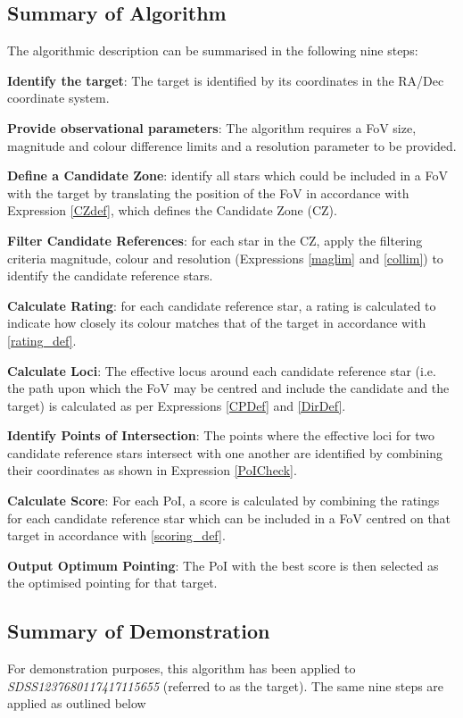 \documentclass{aa}
\begin{document}
\subsection{Summary of Algorithm}
The algorithmic description can be summarised in the following nine steps:

\textbf{Identify the target}: The target is identified by its coordinates in the RA/Dec coordinate system.

\textbf{Provide observational parameters}: The algorithm requires a FoV size, magnitude and colour difference limits and a resolution parameter to be provided.

\textbf{Define a Candidate Zone}: identify all stars which could be included in a FoV with the target by translating the position of the FoV in accordance with Expression \ref{CZdef}, which defines the Candidate Zone (CZ).

\textbf{Filter Candidate References}: for each star in the CZ, apply the filtering criteria magnitude, colour and resolution (Expressions \ref{maglim} and \ref{collim}) to identify the candidate reference stars.

\textbf{Calculate Rating}: for each candidate reference star, a rating is calculated to indicate how closely its colour matches that of the target in accordance with \ref{rating_def}.

\textbf{Calculate Loci}: The effective locus around each candidate reference star (i.e. the path upon which the FoV may be centred and include the candidate and the target) is calculated as per Expressions \ref{CPDef} and \ref{DirDef}.

\textbf{Identify Points of Intersection}: The points where the effective loci for two candidate reference stars intersect with one another are identified by combining their coordinates as shown in Expression \ref{PoICheck}.

\textbf{Calculate Score}: For each PoI, a score is calculated by combining the ratings for each candidate reference star which can be included in a FoV centred on that target in accordance with \ref{scoring_def}.

\textbf{Output Optimum Pointing}: The PoI with the best score is then selected as the optimised pointing for that target.

\subsection{Summary of Demonstration}
For demonstration purposes, this algorithm has been applied to \textit{SDSS1237680117417115655} (referred to as the target). The same nine steps are applied as outlined below
\end{document}
